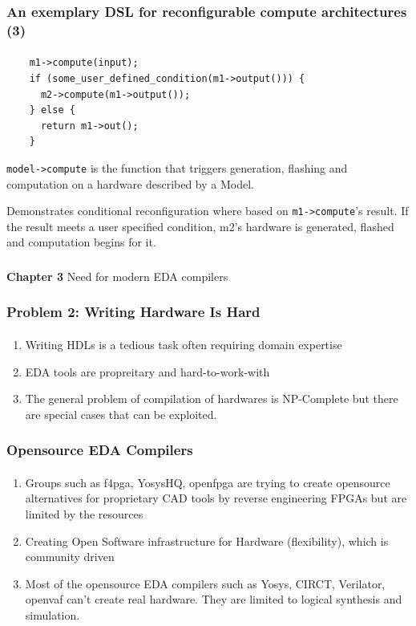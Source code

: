 \documentclass{beamer}
\begin{document}
\begin{frame}[fragile]
  \frametitle{An exemplary DSL for reconfigurable compute architectures (3)}
\framesubtitle{}
  \begin{verbatim}
    m1->compute(input);
    if (some_user_defined_condition(m1->output())) {
      m2->compute(m1->output());
    } else {
      return m1->out();
    }
\end{verbatim}
  \texttt{model->compute} is the function that triggers generation, flashing and
  computation on a hardware described by a Model.

  Demonstrates conditional reconfiguration where based on \texttt{m1->compute}'s
  result. If the result meets a user specified condition, m2's hardware is
  generated, flashed and computation begins for it.
\end{frame}

\begin{frame}[c,fragile]
  \frametitle{}

  \centering
  \textbf{Chapter 3} 
  \centering
  Need for modern EDA compilers
\end{frame}

\begin{frame}[fragile]
  \frametitle{Problem 2: Writing Hardware Is Hard}
  \framesubtitle{}
  \begin{enumerate}
    \item Writing HDLs is a tedious task often requiring domain expertise
    \item EDA tools are propreitary and hard-to-work-with
    \item The general problem of compilation of hardwares is NP-Complete but
      there are special cases that can be exploited.
  \end{enumerate}
\end{frame}


\begin{frame}[fragile]
  \frametitle{Opensource EDA Compilers}
  \framesubtitle{}
  \begin{enumerate}
    \item Groups such as f4pga, YosysHQ, openfpga are trying to create opensource
      alternatives for proprietary CAD tools by reverse engineering FPGAs
      but are limited by the resources 
    \item Creating Open Software infrastructure for Hardware (flexibility),
      which is community driven 
    \item Most of the opensource EDA compilers such as Yosys, CIRCT, Verilator,
      openvaf can't create real hardware. They are limited to
      logical synthesis and simulation.
  \end{enumerate}

\end{frame}
\end{document}
